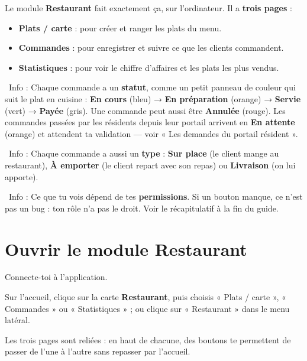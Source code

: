 \documentclass[12pt,a4paper]{article}
\newcommand{\info}[1]{\par\noindent\textcolor{lagoon}{\faInfoCircle\ Info : #1}\par}
\begin{document}
Le module \textbf{Restaurant} fait exactement ça, sur l'ordinateur. Il a \textbf{trois pages} :

\begin{itemize}[label=\textcolor{lagoon}{\faUtensils}]
  \item \textbf{Plats / carte} : pour créer et ranger les plats du menu.
  \item \textbf{Commandes} : pour enregistrer et suivre ce que les clients commandent.
  \item \textbf{Statistiques} : pour voir le chiffre d'affaires et les plats les plus vendus.
\end{itemize}

\info{Chaque commande a un \textbf{statut}, comme un petit panneau de couleur qui suit le plat en cuisine : \textbf{En cours} (bleu) → \textbf{En préparation} (orange) → \textbf{Servie} (vert) → \textbf{Payée} (gris). Une commande peut aussi être \textbf{Annulée} (rouge). Les commandes passées par les résidents depuis leur portail arrivent en \textbf{En attente} (orange) et attendent ta validation — voir « Les demandes du portail résident ».}

\info{Chaque commande a aussi un \textbf{type} : \textbf{Sur place} (le client mange au restaurant), \textbf{À emporter} (le client repart avec son repas) ou \textbf{Livraison} (on lui apporte).}

\info{Ce que tu vois dépend de tes \textbf{permissions}. Si un bouton manque, ce n'est pas un bug : ton rôle n'a pas le droit. Voir le récapitulatif à la fin du guide.}

\newpage

\section{Ouvrir le module Restaurant}\label{sec:ouvrir}

\begin{etapes}
  \item Connecte-toi à l'application.
  \item Sur l'accueil, clique sur la carte \textbf{Restaurant}, puis choisis « Plats / carte », « Commandes » ou « Statistiques » ; ou clique sur « Restaurant » dans le menu latéral.
\end{etapes}

Les trois pages sont reliées : en haut de chacune, des boutons te permettent de passer de l'une à l'autre sans repasser par l'accueil.
\end{document}
